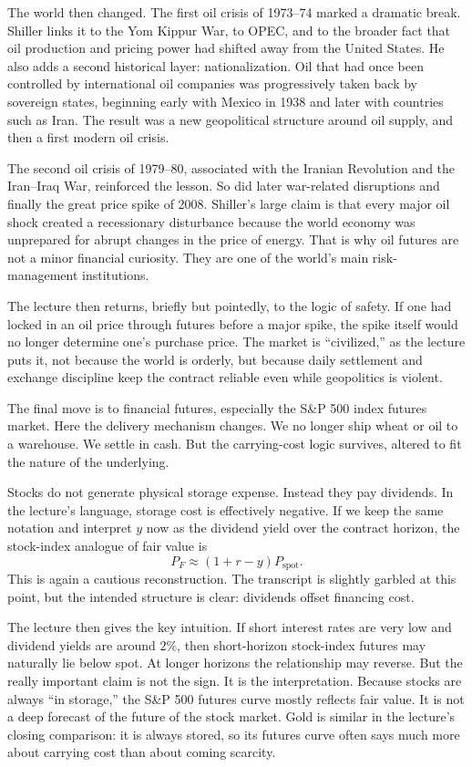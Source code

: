 The world then changed. The first oil crisis of 1973--74 marked a dramatic break. Shiller links it to the Yom Kippur War, to OPEC, and to the broader fact that oil production and pricing power had shifted away from the United States. He also adds a second historical layer: nationalization. Oil that had once been controlled by international oil companies was progressively taken back by sovereign states, beginning early with Mexico in 1938 and later with countries such as Iran. The result was a new geopolitical structure around oil supply, and then a first modern oil crisis.

The second oil crisis of 1979--80, associated with the Iranian Revolution and the Iran--Iraq War, reinforced the lesson. So did later war-related disruptions and finally the great price spike of 2008. Shiller's large claim is that every major oil shock created a recessionary disturbance because the world economy was unprepared for abrupt changes in the price of energy. That is why oil futures are not a minor financial curiosity. They are one of the world's main risk-management institutions.

The lecture then returns, briefly but pointedly, to the logic of safety. If one had locked in an oil price through futures before a major spike, the spike itself would no longer determine one's purchase price. The market is ``civilized,'' as the lecture puts it, not because the world is orderly, but because daily settlement and exchange discipline keep the contract reliable even while geopolitics is violent.

The final move is to financial futures, especially the S\&P 500 index futures market. Here the delivery mechanism changes. We no longer ship wheat or oil to a warehouse. We settle in cash. But the carrying-cost logic survives, altered to fit the nature of the underlying.

Stocks do not generate physical storage expense. Instead they pay dividends. In the lecture's language, storage cost is effectively negative. If we keep the same notation and interpret $y$ now as the dividend yield over the contract horizon, the stock-index analogue of fair value is
\begin{equation}
P_F \approx (1+r-y)P_{\text{spot}}.
\end{equation}
This is again a cautious reconstruction. The transcript is slightly garbled at this point, but the intended structure is clear: dividends offset financing cost.

The lecture then gives the key intuition. If short interest rates are very low and dividend yields are around $2\%$, then short-horizon stock-index futures may naturally lie below spot. At longer horizons the relationship may reverse. But the really important claim is not the sign. It is the interpretation. Because stocks are always ``in storage,'' the S\&P 500 futures curve mostly reflects fair value. It is not a deep forecast of the future of the stock market. Gold is similar in the lecture's closing comparison: it is always stored, so its futures curve often says much more about carrying cost than about coming scarcity.

